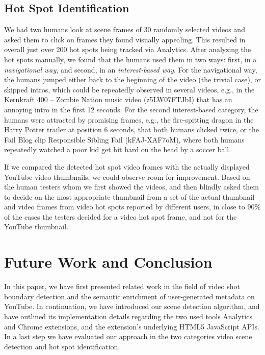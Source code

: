 \documentclass[10pt,twocolumn,letterpaper]{article}
\begin{document}
\subsection{Hot Spot Identification}
We had two humans look at scene frames of 30 randomly selected videos and asked them to click on frames they found visually appealing. This resulted in overall just over 200 hot spots being tracked via Analytics. After analyzing the hot spots manually, we found that the humans used them in two ways: first, in a \emph{navigational way}, and second, in an \emph{interest-based way}. For the navigational way, the humans jumped either back to the beginning of the video (the trivial case), or skipped intros, which could be repeatedly observed in several videos, e.g., in the Kernkraft 400 -- Zombie Nation music video (z5LW07FTJbI) that has an annoying intro in the first 12 seconds. For the second interest-based category, the humans were attracted by promising frames, e.g., the fire-spitting dragon in the Harry Potter trailer at position 6 seconds, that both humans clicked twice, or the Fail Blog clip Responsible Sibling Fail (kFAJ-XAF7oM), where both humans repeatedly watched a poor kid get hit hard on the head by a soccer ball.

If we compared the detected hot spot video frames with the actually displayed YouTube video thumbnails, we could observe room for improvement. Based on the human testers whom we first showed the videos, and then blindly asked them to decide on the most appropriate thumbnail from a set of the actual thumbnail and video frames from video hot spots reported by different users, in close to 90\% of the cases the testers decided for a video hot spot frame, and not for the YouTube thumbnail. 

\section{Future Work and Conclusion} \label{sec:future-work-conclusion}
In this paper, we have first presented related work in the field of video shot boundary detection and the semantic enrichment of user-generated metadata on YouTube. In continuation, we have introduced our scene detection algorithm, and have outlined its implementation details regarding the two used tools Analytics and Chrome extensions, and the extension's underlying HTML5 JavaScript APIs. In a last step we have evaluated our approach in the two categories video scene detection and hot spot identification.
\end{document}
